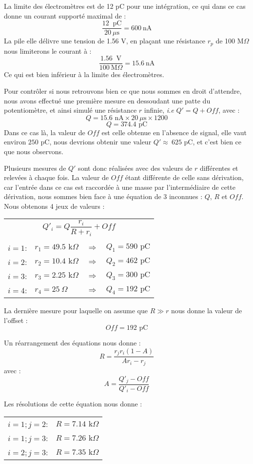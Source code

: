 \documentclass[a4paper,11pt]{article}
\begin{document}
La limite des électromètres est de 12 pC pour une intégration, ce qui dans ce cas donne un courant supporté maximal de : 
$$\frac{12\ \text{ pC}}{20\ \mu\text{s}}=600\ \text{nA}$$
La pile elle délivre une tension de 1.56 V, en plaçant une résistance $r_p$ de 100 M$\Omega$ nous limiterons le courant à :
$$\frac{1.56\ \text{ V}}{100\ \text{M}\Omega}=15.6\ \text{nA}$$
Ce qui est bien inférieur à la limite des électromètres.

Pour contrôler si nous retrouvons bien ce que nous sommes en droit d'attendre, nous avons effectué une première mesure en dessoudant une patte du potentiomètre, et ainsi simulé une résistance $r$ infinie, \textit{i.e} $Q'=Q+Off$, avec :
$$Q=15.6\text{ nA}\times 20\ \mu\text{s}\times 1200$$
$$Q=374.4\text{ pC}$$
Dans ce cas là, la valeur de $Off$ est celle obtenue en l'absence de signal, elle vaut environ $250$ pC, nous devrions obtenir une valeur $Q' \approx\ 625$ pC, et c'est bien ce que nous observons.

Plusieurs mesures de $Q'$ sont donc réalisées avec des valeurs de $r$ différentes et relevées à chaque fois.
La valeur de $Off$ étant différente de celle sans dérivation, car l'entrée dans ce cas est raccordée à une masse par l'intermédiaire de cette dérivation, nous sommes bien face à une équation de 3 inconnues : $Q$, $R$ et $Off$.
Nous obtenons 4 jeux de valeurs :
\begin{center}
\begin{tabular}{llcl}
\multicolumn{4}{c}{$Q'_i=Q\dfrac{r_i}{R+r_i}+Off$}\\
&&&\\
$i=1$:&$r_1=49.5\text{ k}\Omega$&$\Rightarrow$&$Q_1=590\text{ pC}$\\
$i=2$:&$r_2=10.4\text{ k}\Omega$&$\Rightarrow$&$Q_2=462\text{ pC}$\\
$i=3$:&$r_3=2.25\text{ k}\Omega$&$\Rightarrow$&$Q_3=300\text{ pC}$\\
$i=4$:&$r_4=25\ \Omega$&$\Rightarrow$&$Q_4=192\text{ pC}$\\
\end{tabular}
\end{center}

La dernière mesure pour laquelle on assume que $R\gg r$ nous donne la valeur de l'offset :
$$Off=192\text{ pC}$$

Un réarrangement des équations nous donne :
$$R=\frac{r_jr_i(1-A)}{Ar_i-r_j}$$
avec :
$$A=\frac{Q'_j-Off}{Q'_i-Off}$$

Les résolutions de cette équation nous donne :
\begin{center}
\begin{tabular}{lr}
$i=1; j=2$:&$R=7.14\text{ k}\Omega$\\
$i=1; j=3$:&$R=7.26\text{ k}\Omega$\\
$i=2; j=3$:&$R=7.35\text{ k}\Omega$\\
\end{tabular}
\end{center}
\end{document}
